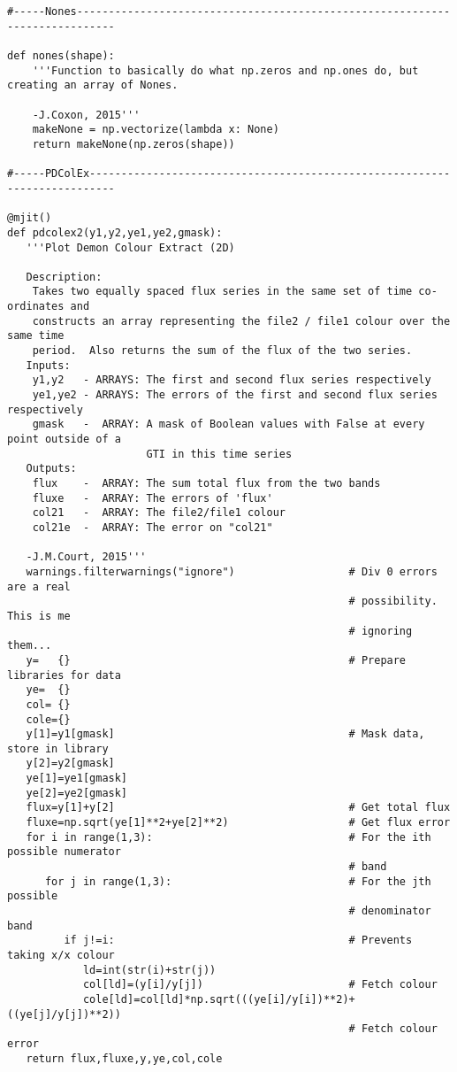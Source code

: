 \begin{verbatim}
#-----Nones----------------------------------------------------------------------------

def nones(shape):
    '''Function to basically do what np.zeros and np.ones do, but creating an array of Nones.
    
    -J.Coxon, 2015'''
    makeNone = np.vectorize(lambda x: None)
    return makeNone(np.zeros(shape))

#-----PDColEx--------------------------------------------------------------------------

@mjit()
def pdcolex2(y1,y2,ye1,ye2,gmask):
   '''Plot Demon Colour Extract (2D)

   Description:
    Takes two equally spaced flux series in the same set of time co-ordinates and
    constructs an array representing the file2 / file1 colour over the same time 
    period.  Also returns the sum of the flux of the two series.
   Inputs:
    y1,y2   - ARRAYS: The first and second flux series respectively
    ye1,ye2 - ARRAYS: The errors of the first and second flux series respectively
    gmask   -  ARRAY: A mask of Boolean values with False at every point outside of a
                      GTI in this time series
   Outputs:
    flux    -  ARRAY: The sum total flux from the two bands
    fluxe   -  ARRAY: The errors of 'flux'
    col21   -  ARRAY: The file2/file1 colour
    col21e  -  ARRAY: The error on "col21"

   -J.M.Court, 2015'''
   warnings.filterwarnings("ignore")                  # Div 0 errors are a real
                                                      # possibility.  This is me
                                                      # ignoring them...
   y=   {}                                            # Prepare libraries for data
   ye=  {}
   col= {}
   cole={}
   y[1]=y1[gmask]                                     # Mask data, store in library
   y[2]=y2[gmask]
   ye[1]=ye1[gmask]
   ye[2]=ye2[gmask]
   flux=y[1]+y[2]                                     # Get total flux
   fluxe=np.sqrt(ye[1]**2+ye[2]**2)                   # Get flux error
   for i in range(1,3):                               # For the ith possible numerator
                                                      # band
      for j in range(1,3):                            # For the jth possible
                                                      # denominator band
         if j!=i:                                     # Prevents taking x/x colour
            ld=int(str(i)+str(j))
            col[ld]=(y[i]/y[j])                       # Fetch colour
            cole[ld]=col[ld]*np.sqrt(((ye[i]/y[i])**2)+((ye[j]/y[j])**2))
                                                      # Fetch colour error
   return flux,fluxe,y,ye,col,cole


\end{verbatim}
